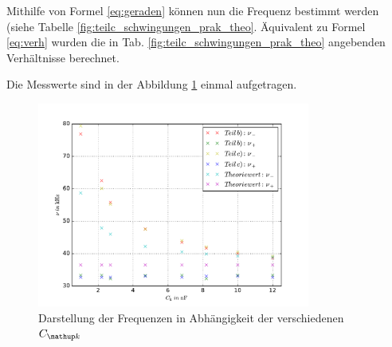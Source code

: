 Mithilfe von Formel \eqref{eq:geraden} können nun die Frequenz bestimmt werden (siehe Tabelle \ref{fig:teilc_schwingungen_prak_theo}.
Äquivalent zu Formel \eqref{eq:verh} wurden die in Tab. \ref{fig:teilc_schwingungen_prak_theo} angebenden Verhältnisse berechnet.

Die Messwerte sind in der Abbildung \ref{fig: plot} einmal aufgetragen. %
\begin{figure}
  \centering
  \includegraphics[width=0.8\textwidth]{pics/plot_frequenzen.pdf}
  \caption{Darstellung der Frequenzen in Abhängigkeit der verschiedenen $C\ua{k}$}
  \label{fig: plot}
\end{figure}
